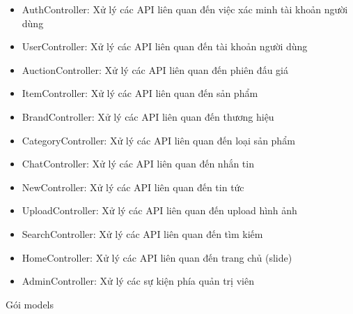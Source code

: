 \documentclass[../DoAn.tex]{subfiles}
\begin{document}
\begin{itemize}
    \item AuthController: Xử lý các API liên quan đến việc xác minh tài khoản người dùng
    \item UserController: Xử lý các API liên quan đến tài khoản người dùng 
    \item AuctionController: Xử lý các API liên quan đến phiên đấu giá
    \item ItemController: Xử lý các API liên quan đến sản phẩm
    \item BrandController: Xử lý các API liên quan đến thương hiệu
    \item CategoryController: Xử lý các API liên quan đến loại sản phẩm
    \item ChatController: Xử lý các API liên quan đến nhắn tin
    \item NewController: Xử lý các API liên quan đến tin tức
    \item UploadController: Xử lý các API liên quan đến upload hình ảnh
    \item SearchController: Xử lý các API liên quan đến tìm kiếm
    \item HomeController: Xử lý các API liên quan đến trang chủ (slide)
    \item AdminController: Xử lý các sự kiện phía quản trị viên
\end{itemize}
Gói models
\end{document}
